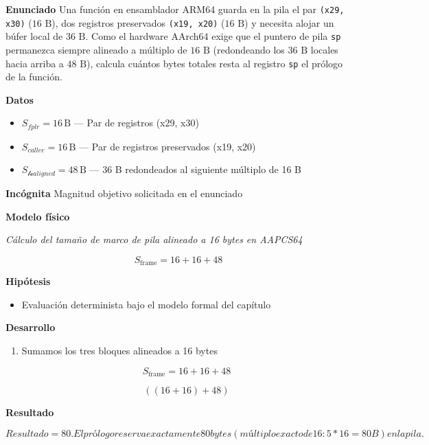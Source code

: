 \documentclass{book}
\begin{document}
\begin{tcolorbox}[title={Problema resuelto}, studiumworked, breakable]

\noindent\textbf{Enunciado}
Una función en ensamblador ARM64 guarda en la pila el par \texttt{(x29, x30)} (\(16\text{ B}\)), dos registros preservados \texttt{(x19, x20)} (\(16\text{ B}\)) y necesita alojar un búfer local de \(36\text{ B}\). Como el hardware AArch64 exige que el puntero de pila \texttt{sp} permanezca siempre alineado a múltiplo de \(16\text{ B}\) (redondeando los \(36\text{ B}\) locales hacia arriba a \(48\text{ B}\)), calcula cuántos bytes totales resta al registro \texttt{sp} el prólogo de la función.

\noindent\textbf{Datos}
\begin{itemize}
\item $S_{fplr} = 16\,\mathrm{B}$ — Par de registros (x29, x30)
\item $S_{callee} = 16\,\mathrm{B}$ — Par de registros preservados (x19, x20)
\item $S_{\mathcal{lo} aligned} = 48\,\mathrm{B}$ — 36 B redondeados al siguiente múltiplo de 16 B
\end{itemize}

\noindent\textbf{Incógnita}
Magnitud objetivo solicitada en el enunciado

\noindent\textbf{Modelo físico}

\noindent\textit{Cálculo del tamaño de marco de pila alineado a 16 bytes en AAPCS64}

\[
S_{\text{frame}} = 16 + 16 + 48
\]

\noindent\textbf{Hipótesis}
\begin{itemize}
\item Evaluación determinista bajo el modelo formal del capítulo
\end{itemize}

\noindent\textbf{Desarrollo}
\begin{enumerate}
\item
Sumamos los tres bloques alineados a 16 bytes

\[
S_{\text{frame}} = 16 + 16 + 48
\]

\[
\left(\left(16+16\right)+48\right)
\]
\end{enumerate}

\noindent\textbf{Resultado}

\[
Resultado = 80. El prólogo reserva exactamente 80 bytes (múltiplo exacto de 16: 5 * 16 = 80 B) en la pila.
\]


\end{tcolorbox}
\end{document}
